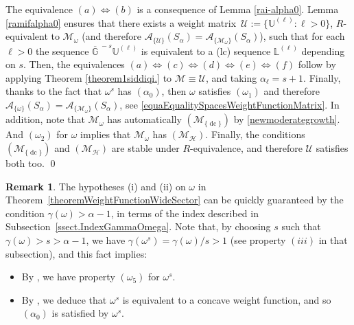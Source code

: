 \documentclass[11pt,a4paper]{article}
\theoremstyle{plain}
\theoremstyle{definition}
\newtheorem{remark}[proposition]{Remark}
\newcommand{\LL}{\mathbb{L}}
\newcommand{\G}{\mathbb{G}}
\let\on=\operatorname
\begin{document}
The equivalence $(a)\Leftrightarrow(b)$ is a consequence of Lemma \ref{rai-alpha0}. Lemma \ref{ramifalpha0} ensures that there exists a weight matrix $\,\mathcal{U}:=\{\mathbb{U}^{(\ell)}: \ell>0\}$, $R$-equivalent to $\mathcal{M}_{\omega}$ (and therefore $\mathcal{A}_{\{\mathcal{U}\}}(S_{\alpha})= \mathcal{A}_{\{\mathcal{M}_{\omega}\}}(S_{\alpha})$), such that for each $\ell>0$ the sequence $\overline{\G}^{\;-s}\mathbb{U}^{(\ell)}$ is equivalent to a (lc) sequence $\LL^{(\ell)}$ depending on $s$. Then, the equivalences $(a)\Leftrightarrow(c)\Leftrightarrow(d)\Leftrightarrow(e) \Leftrightarrow(f)$ follow by applying Theorem \ref{theorem1siddiqi.} to $\mathcal{M}\equiv\mathcal{U}$, and taking $\alpha_\ell=s+1$. Finally, thanks to the fact that $\omega^s$ has $(\alpha_0)$, then $\omega$ satisfies $(\omega_1)$ and therefore $\mathcal{A}_{\{\omega\}}(S_{\alpha})= \mathcal{A}_{\{\mathcal{M}_{\omega}\}}(S_{\alpha})$, see \eqref{equaEqualitySpacesWeightFunctionMatrix}.
In addition, note that $\mathcal{M}_{\omega}$ has automatically \hyperlink{R-dc}{$(\mathcal{M}_{\{\on{dc}\}})$} by \eqref{newmoderategrowth}. And $(\omega_2)$ for $\omega$ implies that $\mathcal{M}_\omega$ has \hyperlink{holom}{$(\mathcal{M}_{\mathcal{H}})$}. Finally, the conditions \hyperlink{R-dc}{$(\mathcal{M}_{\{\on{dc}\}})$} and \hyperlink{holom}{$(\mathcal{M}_{\mathcal{H}})$} are stable under $R$-equivalence, and therefore $\mathcal{U}$ satisfies both too.
\qed\enddemo

\begin{remark}\label{gammaindex-omega}
The hypotheses (i) and (ii) on $\omega$ in Theorem~\ref{theoremWeightFunctionWideSector} can be quickly guaranteed by the condition $\gamma(\omega) > \alpha -1$, in terms of the index described in Subsection~\ref{ssect.IndexGammaOmega}. Note that, by choosing $s$ such that $\gamma(\omega) > s > \alpha-1$,
we have  $\gamma(\omega^s) = \gamma(\omega) / s > 1$ (see property $(iii)$ in that subsection), and this fact implies:
\begin{itemize}
    \item[(a)] By \cite[Remark 2.15 $(i)\Rightarrow(v)$]{index}, we have property $(\omega_5)$ for $\omega^s$.

    \item[(b)] By \cite[Thm. 2.11 $(v)\Rightarrow(ii)$]{index}, we deduce that $\omega^s$ is equivalent to a concave weight function, and so $(\alpha_0)$ is satisfied by $\omega^s$.
\end{itemize}
\end{remark}
\end{document}
